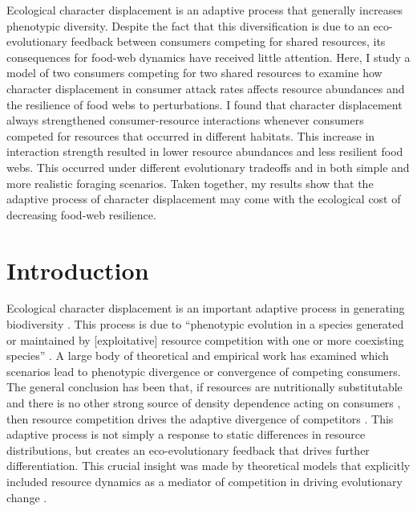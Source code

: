 \documentclass[11pt,]{article}
\begin{document}
Ecological character displacement is an adaptive process that generally
increases phenotypic diversity. Despite the fact that this
diversification is due to an eco-evolutionary feedback between consumers
competing for shared resources, its consequences for food-web dynamics
have received little attention. Here, I study a model of two consumers
competing for two shared resources to examine how character displacement
in consumer attack rates affects resource abundances and the resilience
of food webs to perturbations. I found that character displacement
always strengthened consumer-resource interactions whenever consumers
competed for resources that occurred in different habitats. This
increase in interaction strength resulted in lower resource abundances
and less resilient food webs. This occurred under different evolutionary
tradeoffs and in both simple and more realistic foraging scenarios.
Taken together, my results show that the adaptive process of character
displacement may come with the ecological cost of decreasing food-web
resilience.

\newpage

\section{Introduction}\label{introduction}

Ecological character displacement is an important adaptive process in
generating biodiversity \citep{Schluter2000, Pfennig2010}. This process
is due to ``phenotypic evolution in a species generated or maintained by
{[}exploitative{]} resource competition with one or more coexisting
species'' \citep{Schluter2000}. A large body of theoretical
\citep[e.g.][]{Lawlor1976, Abrams1986, Doebeli1996, Taper1985, McPeek2019}
and empirical \citep[reviewed
in:][]{Schluter2000, Dayan2005, Stuart2013} work has examined which
scenarios lead to phenotypic divergence or convergence of competing
consumers. The general conclusion has been that, if resources are
nutritionally substitutable \citep{Abrams1987, Fox2008} and there is no
other strong source of density dependence acting on consumers
\citep{Abrams1986}, then resource competition drives the adaptive
divergence of competitors \citep{Lawlor1976, Taper1985}. This adaptive
process is not simply a response to static differences in resource
distributions, but creates an eco-evolutionary feedback that drives
further differentiation. This crucial insight was made by theoretical
models that explicitly included resource dynamics as a mediator of
competition in driving evolutionary change
\citep{Lawlor1976, Abrams1986, Taper1985}.
\end{document}
